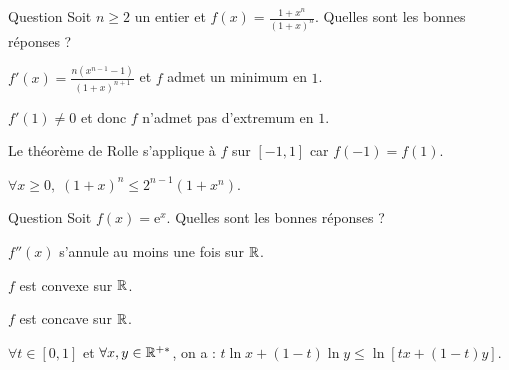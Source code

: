 \begin{multi}[multiple,feedback=
{La dérivée de \(f(x)\) est \(\displaystyle f'(x)=\frac{n(x^{n-1}-1)}{(1+x)^{n+1}}\) et \(f\) admet bien un minimum en \(1\) (dresser le tableau de variations de \(f\)). En particulier,
\[\forall x\geq 0,\; f(1)\leq f(x)\Leftrightarrow (1+x)^n\leq 2^{n-1}(1+x^n).\]
}]{Question}
Soit \(n\geq 2\) un entier et \(\displaystyle f(x)=\frac{1+x^n}{(1+x)^n}\). Quelles sont les bonnes réponses ?

    \item* \(\displaystyle f'(x)=\frac{n(x^{n-1}-1)}{(1+x)^{n+1}}\) et \(f\) admet un minimum en \(1\).
    \item \(f'(1)\neq 0\) et donc \(f\) n'admet pas d'extremum en \(1\).
    \item Le théorème de Rolle s'applique à \(f\) sur \([-1,1]\) car \(f(-1)=f(1)\).
    \item* \(\forall x\geq 0,\; (1+x)^n\leq 2^{n-1}(1+x^n)\).
\end{multi}


\begin{multi}{Question}
Soit \(f(x)=\mathrm{e}^x\). Quelles sont les bonnes réponses ?

    \item \(f''(x)\) s'annule au moins une fois sur \(\mathbb{R}\).
    \item* \(f\) est convexe sur \(\mathbb{R}\).
    \item \(f\) est concave sur \(\mathbb{R}\).
    \item* \(\forall t\in [0,1]\) et \(\forall x,y\in \mathbb{R}^{+*}\), on a : \(t\ln x+(1-t)\ln y\leq \ln \left[tx+(1-t)y\right]\).
\end{multi}



